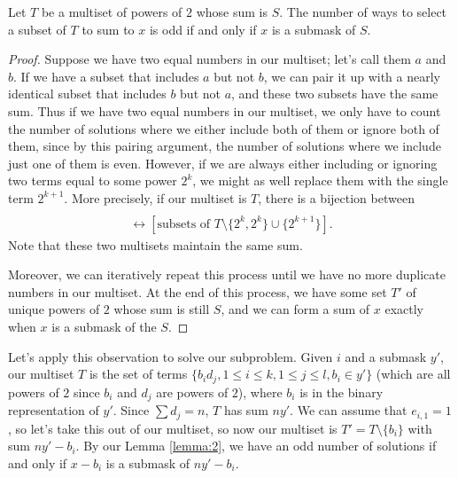 \documentclass[11pt]{scrartcl}
\begin{document}
\begin{lemma}
  \label{lemma:2}
  Let $T$ be a multiset of powers of $2$ whose sum is $S$.
  The number of ways to select a subset of $T$ to sum to $x$ is odd if and only if $x$ is a submask of $S$.
\end{lemma}
\begin{proof}
Suppose we have two equal numbers in our multiset; let's call them $a$ and $b$.
If we have a subset that includes $a$ but not $b$, we can pair it up with a nearly identical subset that includes $b$ but not $a$, and these two subsets have the same sum.
Thus if we have two equal numbers in our multiset, we only have to count the number of solutions where we either include both of them or ignore both of them, since by this pairing argument, the number of solutions where we include just one of them is even.
However, if we are always either including or ignoring two terms equal to some power $2^k$, we might as well replace them with the single term $2^{k+1}$.
  More precisely, if our multiset is $T$, there is a bijection between 
  \begin{align*}
    [\text{subsets of $T$ that either both include or ignore $a$ and $b$}] \\
    \leftrightarrow [\text{subsets of $T \setminus \{2^k, 2^k\} \cup \{2^{k+1}\}$}].
  \end{align*}
Note that these two multisets maintain the same sum.

Moreover, we can iteratively repeat this process until we have no more duplicate numbers in our multiset.
At the end of this process, we have some set $T'$ of unique powers of $2$ whose sum is still $S$, and we can form a sum of $x$ exactly when $x$ is a submask of the $S$.
\end{proof}

Let's apply this observation to solve our subproblem.
Given $i$ and a submask $y'$, our multiset $T$ is the set of terms $\{ b_i d_j, 1 \leq i \leq k, 1 \leq j \leq l, b_i \in y' \}$ (which are all powers of $2$ since $b_i$ and $d_j$ are powers of $2$), where $b_i$ is in the binary representation of $y'$.
Since $\sum d_j = n$, $T$ has sum $ny'$.
We can assume that $e_{i, 1} = 1$, so let's take this out of our multiset, so now our multiset is $T' = T \setminus \{b_i\}$ with sum $ny' - b_i$.
By our Lemma \ref{lemma:2}, we have an odd number of solutions if and only if $x - b_i$ is a submask of $ny' - b_i$.
\end{document}
